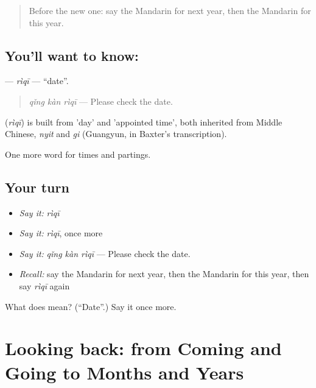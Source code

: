 \label{lesson:ZH-C47-riqi}



\begin{quote}
Before the new one: say the Mandarin for next year, then the Mandarin for this year.
\end{quote}

\subsection*{You'll want to know: }
\textbf{} — \emph{rìqī} — \textquotedblleft{}date\textquotedblright{}.

\begin{quote}
\textbf{} \emph{qǐng kàn rìqī} — Please check the date.
\end{quote}

\begin{cousinweb}
\textbf{} (\emph{rìqī}) is built from  'day' and  'appointed time', both inherited from Middle Chinese, \emph{nyit} and \emph{gi} (Guangyun, in Baxter's transcription).
\end{cousinweb}

\begin{grammarlens}[title={What you've built}]
One more word for times and partings.
\end{grammarlens}

\subsection*{Your turn}
\begin{itemize}
\raggedright
  \item \emph{Say it:} \emph{rìqī}
  \item \emph{Say it:} \emph{rìqī}, once more
  \item \emph{Say it:} \emph{qǐng kàn rìqī} — Please check the date.
  \item \emph{Recall:} say the Mandarin for next year, then the Mandarin for this year, then say \emph{rìqī} again
\end{itemize}

\begin{tcolorbox}[breakable,colback=teal!4,colframe=teal!35!black,title={Before you move on}]
What does  mean? (\textquotedblleft{}Date\textquotedblright{}.) Say it once more.
\end{tcolorbox}
\section[(dialogue)]{Looking back: from Coming and Going to Months and Years}

